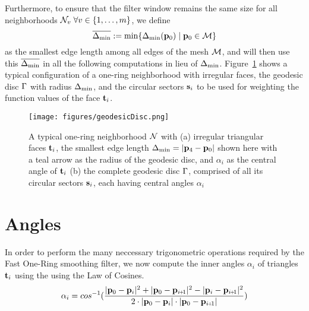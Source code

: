 Furthermore, to ensure that the filter window remains the same size for all neighborhoods $\mathcal{N}_v\;\forall v \in \{1,\ldots,m\}$, we define
\begin{equation}
	\overline{\Delta_\text{min}} := \min\{\Delta_\text{min}(\mathbf{p}_0) \;|\; \mathbf{p}_0 \in \mathcal{M}\}
	\label{eq:globalMinimumEdgeLength}
\end{equation}%
%
%
as the smallest edge length among all edges of the mesh $\mathcal{M}$, and will then use this $\overline{\Delta_\text{min}}$ in all the following computations in lieu of $\Delta_\text{min}$.
%
Figure~\ref{fig:geodesicDisc} shows a typical configuration of a one-ring neighborhood with irregular faces, the geodesic disc $\Gamma$ with radius $\Delta_\text{min}$, and the circular sectors $\mathbf{s}_i$ to be used for weighting the function values of the face $\mathbf{t}_i$.
\begin{figure}[ht]
\ffigbox
	{\texttt{[image: figures/geodesicDisc.png]}}
	{\caption[One-ring and geodesic disc]{A typical one-ring neighborhood $\mathcal{N}$ with (a) irregular triangular faces $\mathbf{t}_i$, the smallest edge length $\Delta_\text{min} = |\mathbf{p}_4 - \mathbf{p}_0|$ shown here with a teal arrow as the radius of the geodesic disc, and $\alpha_i$ as the central angle of $\mathbf{t}_i$ (b) the complete geodesic disc $\Gamma$, comprised of all its circular sectors $\mathbf{s}_i$, each having central angles $\alpha_i$}\label{fig:geodesicDisc}}
\end{figure}%
%
%
%
\section{Angles}
\label{cFONSsA}
In order to perform the many neccessary trigonometric operations required by the Fast One-Ring smoothing filter, we now compute the inner angles $\alpha_i$ of triangles $\mathbf{t}_i$ using the using the Law of Cosines. 
\begin{equation}
	\alpha_i = cos^{-1}(\frac{|\bp_0 - \bp_{i}|^2 + |\bp_0 - \bp_{\sipo}|^2 - |\bp_i - \bp_{\sipo}|^2}{2\cdot|\bp_0 - \bp_{i}|\cdot|\bp_0 - \bp_{\sipo}|})
	\label{eq:alphaFromEdgeLengths}
\end{equation}%
%

